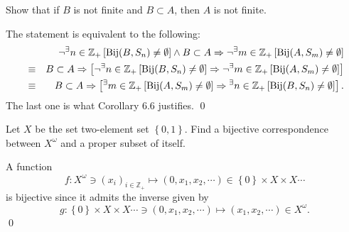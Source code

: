 \documentclass[a4paper,12pt]{article}
\begin{document}
\begin{exe}
	Show that if \( B \) is not finite and \( B \subset A \),
	then \( A \) is not finite.
\end{exe}\begin{sol}
	The statement is equivalent to the following:
	\begin{eqnarray*}
		&&
		\neg {}^{\exists} n\in \mathbb{Z}_{+}
		\left[ \mathrm{Bij}(B,S_n) \neq \emptyset \right]
		\wedge
		B \subset A
		\Rightarrow
		\neg {}^{\exists} m \in \mathbb{Z}_{+}
		\left[ \mathrm{Bij}(A,S_m) \neq \emptyset \right]\\
		&\equiv&
		B \subset A
		\Rightarrow
		\left[
			\neg {}^{\exists} n\in \mathbb{Z}_{+}
			\left[ \mathrm{Bij}(B,S_n) \neq \emptyset \right]
			\Rightarrow
			\neg {}^{\exists} m \in \mathbb{Z}_{+}
			\left[ \mathrm{Bij}(A,S_m) \neq \emptyset \right]
			\right]\\
		&\equiv&
		B \subset A
		\Rightarrow
		\left[
			{}^{\exists} m \in \mathbb{Z}_{+}
			\left[ \mathrm{Bij}(A,S_m) \neq \emptyset \right]
			\Rightarrow
			{}^{\exists} n\in \mathbb{Z}_{+}
			\left[ \mathrm{Bij}(B,S_n) \neq \emptyset \right]
			\right].
	\end{eqnarray*}
	The last one is what Corollary 6.6 justifies.
	\qed\end{sol}

\begin{exe}
	Let \( X \) be the set two-element set \( \left\{ 0,1 \right\} \).
	Find a bijective correspondence between \( X^{\omega} \)
	and a proper subset of itself.
\end{exe}\begin{sol}
	A function
	\begin{equation*}
		f:X^{\omega} \ni \left( x_{i} \right)_{i\in \mathbb{Z}_{+}}
		\mapsto
		(0,x_1,x_2,\cdots) \in \left\{ 0 \right\} \times X \times X \cdots
	\end{equation*}
	is bijective since it admits the inverse given by
	\begin{equation*}
		g:\left\{ 0 \right\} \times X \times X \cdots \ni (0,x_1,x_2,\cdots)
		\mapsto
		(x_1,x_2,\cdots) \in X^{\omega}.
	\end{equation*}
	\qed\end{sol}
\end{document}
